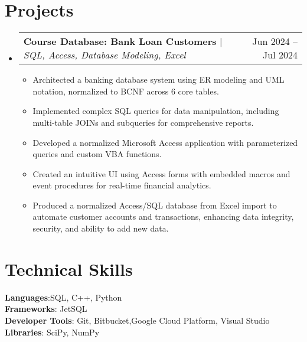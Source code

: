 \documentclass[letterpaper,11pt]{article}
\makeatletter
\newcommand{\resumeItem}[1]{
  \item\small{
    {#1 \vspace{-2pt}}
  }
}
\newcommand{\resumeProjectHeading}[2]{
    \item
    \begin{tabular*}{0.97\textwidth}{l@{\extracolsep{\fill}}r}
      \small#1 & #2 \\
    \end{tabular*}\vspace{-7pt}
}
\newcommand{\resumeSubHeadingListStart}{\begin{itemize}[leftmargin=0.15in, label={}]}
\newcommand{\resumeSubHeadingListEnd}{\end{itemize}}
\newcommand{\resumeItemListStart}{\begin{itemize}}
\newcommand{\resumeItemListEnd}{\end{itemize}\vspace{-5pt}}
\makeatother
\begin{document}
\section{Projects}
    \resumeSubHeadingListStart
      \resumeProjectHeading
          {\textbf{Course Database: Bank Loan Customers} $|$ \emph{SQL, Access, Database Modeling, Excel}}{Jun 2024 -- Jul 2024}
          \resumeItemListStart
            \resumeItem{Architected a banking database system using ER modeling and UML notation, normalized to BCNF across 6 core tables.}
            \resumeItem{Implemented complex SQL queries for data manipulation, including multi-table JOINs and subqueries for comprehensive reports.}
            \resumeItem{Developed a normalized Microsoft Access application with parameterized queries and custom VBA functions.}
            \resumeItem{Created an intuitive UI using Access forms with embedded macros and event procedures for real-time financial analytics.}
             \resumeItem{Produced a normalized Access/SQL database from Excel import to automate customer accounts and transactions, enhancing data integrity, security, and ability to add new data. }
          \resumeItemListEnd
    \resumeSubHeadingListEnd

\section{Technical Skills}
 \begin{itemize}[leftmargin=0.15in, label={}]
    \small{\item{
     \textbf{Languages}{:SQL, C++, Python} \\
     \textbf{Frameworks}{: JetSQL } \\
     \textbf{Developer Tools}{: Git, Bitbucket,Google Cloud Platform, Visual Studio} \\
     \textbf{Libraries}{: SciPy, NumPy}
    }}
 \end{itemize}
\end{document}
